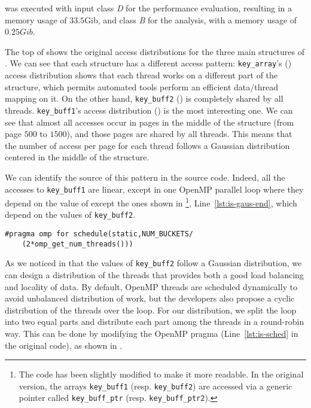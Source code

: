 \IS was executed with input class \emph{D} for the performance evaluation, resulting in a memory usage of $33.5$Gib, and class \emph{B} for the analysis, with a memory usage of $0.25Gib$.

The top of  shows the original access distributions for the three main structures of \IS.
We can see that each structure has a different access pattern: \texttt{key\_array}'s () access distribution shows that each thread works on a different part of the structure, which permits automated tools perform an efficient data/thread mapping on it.
On the other hand, \texttt{key\_buff2} () is completely shared by all threads.
\texttt{key\_buff1}'s access distribution () is the most interesting one.
We can see that almost all accesses occur in pages in the middle of the structure (from page $500$ to $1500$), and those pages are shared by all threads.
This means that the number of access per page  for each thread follows a Gaussian distribution centered in the middle of the structure.



We can identify the source of this pattern in the \IS source code.
Indeed, all the accesses to \texttt{key\_buff1} are linear, except in one \gls{OpenMP} parallel loop where they depend on the value of except the ones shown in \footnote{
    The code has been slightly modified to make it more readable.
    In the original version, the arrays \texttt{key\_buff1} (resp. \texttt{key\_buff2}) are accessed via a generic pointer called \texttt{key\_buff\_ptr} (resp. \texttt{key\_buff\_ptr2}).
    }, Line~\ref{lst:is-gaus-end}, which depend on the values of \texttt{key\_buff2}.

\begin{lstlisting}[float=!h,caption=Optimization for \IS., label=lst:is-modif]
#pragma omp for schedule(static,NUM_BUCKETS/
    (2*omp_get_num_threads()))
\end{lstlisting}

As we noticed in  that the values of \texttt{key\_buff2} follow a Gaussian distribution, we can design a distribution of the threads that provides both a good load balancing and locality of data.
By default, \gls{OpenMP} threads are scheduled dynamically to avoid unbalanced distribution of work, but the developers also propose a cyclic distribution of the threads over the loop.
For our distribution, we split the loop into two equal parts and distribute each part among the threads in a round-robin way.
This can be done by modifying the \gls{OpenMP} pragma (Line~\ref{lst:is-sched} in the original code), as shown in .


